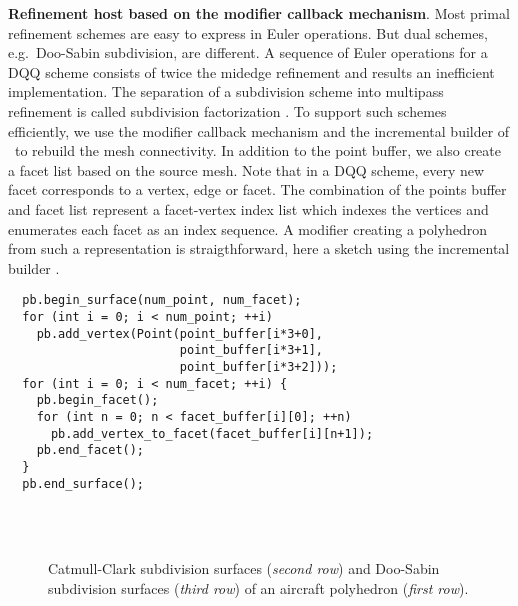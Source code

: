 \noindent\textbf{Refinement host based on the modifier callback mechanism}.
Most primal refinement schemes are easy to express in Euler
operations. But dual schemes, e.g.\ Doo-Sabin subdivision, are
different. A sequence of Euler operations for a DQQ scheme consists of
twice the midedge refinement \cite{Peters:1997:SSS} and results
an inefficient implementation. The separation of a
subdivision scheme into multipass refinement is
called subdivision factorization \cite{Joe:2003:FASS, Denis:2001:UFPDQ}. 
To support such schemes efficiently, we use
the modifier callback mechanism and the incremental builder of
\cgalpoly\ to rebuild the mesh connectivity. In addition to the point
buffer, we also create a facet list based on the source mesh. Note
that in a DQQ scheme, every new facet corresponds to a vertex, edge or
facet. The combination of the points buffer and facet list represent a
facet-vertex index list which indexes the vertices and enumerates each
facet as an index sequence. A modifier creating a polyhedron from such
a representation is straigthforward, here a sketch using the
incremental builder .
\begin{lstlisting}
  pb.begin_surface(num_point, num_facet);
  for (int i = 0; i < num_point; ++i) 
    pb.add_vertex(Point(point_buffer[i*3+0], 
                        point_buffer[i*3+1], 
                        point_buffer[i*3+2]));        
  for (int i = 0; i < num_facet; ++i) {
    pb.begin_facet();
    for (int n = 0; n < facet_buffer[i][0]; ++n)
      pb.add_vertex_to_facet(facet_buffer[i][n+1]);
    pb.end_facet();
  }
  pb.end_surface();
\end{lstlisting}\vspace*{-3mm}

\begin{figure}
  \centering
   \\
  \\
  \caption{Catmull-Clark subdivision surfaces ({\itshape second row}) and
  Doo-Sabin subdivision surfaces ({\itshape third row}) 
  of an aircraft polyhedron ({\itshape first row}).
  }
  \label{fig:SubExample}\vspace*{-2mm}
\end{figure}

